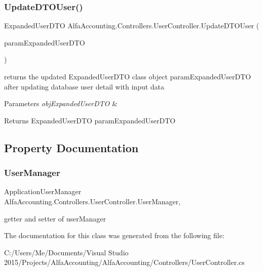 \subsubsection{\texorpdfstring{Update\+D\+T\+O\+User()}{UpdateDTOUser()}}
{\footnotesize\ttfamily Expanded\+User\+D\+TO Alfa\+Accounting.\+Controllers.\+User\+Controller.\+Update\+D\+T\+O\+User (\begin{DoxyParamCaption}\item[{Expanded\+User\+D\+TO}]{param\+Expanded\+User\+D\+TO }\end{DoxyParamCaption})\hspace{0.3cm}{\ttfamily [private]}}



returns the updated Expanded\+User\+D\+TO class object param\+Expanded\+User\+D\+TO after updating database user detail with input data 


\begin{DoxyParams}{Parameters}
{\em obj\+Expanded\+User\+D\+TO} & \\
\hline
\end{DoxyParams}
\begin{DoxyReturn}{Returns}
Expanded\+User\+D\+TO param\+Expanded\+User\+D\+TO
\end{DoxyReturn}


\subsection{Property Documentation}
\mbox{\label{class_alfa_accounting_1_1_controllers_1_1_user_controller_a88b94fb079c158860b583be20660201f}} 
\subsubsection{\texorpdfstring{User\+Manager}{UserManager}}
{\footnotesize\ttfamily Application\+User\+Manager Alfa\+Accounting.\+Controllers.\+User\+Controller.\+User\+Manager\hspace{0.3cm}{\ttfamily [get]}, {}}



getter and setter of user\+Manager 



The documentation for this class was generated from the following file\+:\begin{DoxyCompactItemize}
\item 
C\+:/\+Users/\+Me/\+Documents/\+Visual Studio 2015/\+Projects/\+Alfa\+Accounting/\+Alfa\+Accounting/\+Controllers/User\+Controller.\+cs\end{DoxyCompactItemize}
